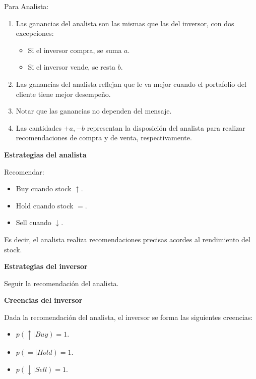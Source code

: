 \documentclass[12pt]{article}
\begin{document}
Para Analista:

\begin{enumerate}
\setlength{\itemsep}{0pt}
\setlength{\parskip}{0pt}
\setlength{\parsep}{0pt}
	\item Las ganancias del analista son las mismas que las del inversor, con dos excepciones: \begin{itemize}
	\setlength{\itemsep}{0pt}
	\setlength{\parskip}{0pt}
	\setlength{\parsep}{0pt}
		\item Si el inversor compra, se suma $ a $.
		\item Si el inversor vende, se resta $ b $.
	\end{itemize}
	\item Las ganancias del analista reflejan que le va mejor cuando el portafolio del cliente tiene mejor desempeño.
	\item Notar que las ganancias no dependen del mensaje.
	\item Las cantidades $ +a, -b $ representan la disposición del analista para realizar recomendaciones de compra y de venta, respectivamente. 
\end{enumerate}

\textbf{Estrategias del analista}

Recomendar:

\begin{itemize}
	\setlength{\itemsep}{0pt}
	\setlength{\parskip}{0pt}
	\setlength{\parsep}{0pt}
	\item Buy cuando stock $ \uparrow $.
	\item Hold cuando stock $ = $.
	\item Sell cuando $ \downarrow  $.
\end{itemize}

Es decir, el analista realiza recomendaciones precisas acordes al rendimiento del stock.

\textbf{Estrategias del inversor}

Seguir la recomendación del analista.

\textbf{Creencias del inversor}

Dada la recomendación del analista, el inversor se forma las siguientes creencias:

\begin{itemize}
	\setlength{\itemsep}{0pt}
	\setlength{\parskip}{0pt}
	\setlength{\parsep}{0pt}
	\item $ p(\uparrow | Buy) = 1 $.
	\item $ p(=| Hold) = 1 $.
	\item $ p(\downarrow | Sell) = 1 $.
\end{itemize}
\end{document}
